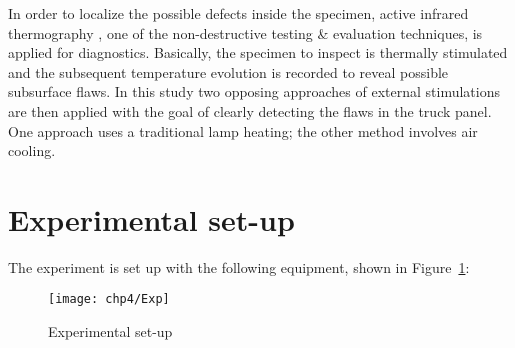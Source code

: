 
In order to localize the possible defects inside the specimen, active infrared thermography \citet{Maldague2001theory,Balageas2016}, one of the non-destructive testing \& evaluation techniques, is applied for diagnostics. Basically, the specimen to inspect is thermally stimulated and the subsequent temperature evolution is recorded to reveal possible subsurface ﬂaws. In this study two opposing approaches of external stimulations are then applied with the goal of clearly detecting the flaws in the truck panel. One approach uses a traditional lamp heating; the other method involves air cooling. 


\section{Experimental set-up}
The experiment is set up with the following equipment, shown in Figure~\ref{Exp}:
\begin{figure}
    \centering
    \texttt{[image: chp4/Exp]}
    \caption{Experimental set-up}
    \label{Exp}
\end{figure}

